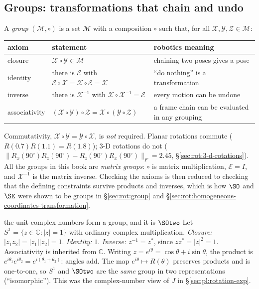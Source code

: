 \subsection{Groups: transformations that chain and undo}\label{sec:lie:group-axioms}

A \emph{group} $(\mathcal M,\circ)$ is a set $\mathcal M$ with a composition $\circ$ such that, for all $\mathcal X,\mathcal Y,\mathcal Z\in\mathcal M$:
\begin{center}\small
\begin{tabular}{@{}lll@{}}\toprule
axiom & statement & robotics meaning\\\midrule
closure & $\mathcal X\circ\mathcal Y\in\mathcal M$ & chaining two poses gives a pose\\
identity & there is $\mathcal E$ with $\mathcal E\circ\mathcal X=\mathcal X\circ\mathcal E=\mathcal X$ & ``do nothing'' is a transformation\\
inverse & there is $\mathcal X^{-1}$ with $\mathcal X\circ\mathcal X^{-1}=\mathcal E$ & every motion can be undone\\
associativity & $(\mathcal X\circ\mathcal Y)\circ\mathcal Z=\mathcal X\circ(\mathcal Y\circ\mathcal Z)$ & a frame chain can be evaluated in any grouping\\\bottomrule
\end{tabular}
\end{center}
Commutativity, $\mathcal X\circ\mathcal Y=\mathcal Y\circ\mathcal X$, is \emph{not} required. Planar rotations commute ($R(0.7)R(1.1)=R(1.8)$); 3-D rotations do not ($\|R_x(90^\circ)R_z(90^\circ)-R_z(90^\circ)R_x(90^\circ)\|_F=2.45$, \S\ref{sec:rot:3-d-rotations}). All the groups in this book are \emph{matrix groups}: $\circ$ is matrix multiplication, $\mathcal E=I$, and $\mathcal X^{-1}$ is the matrix inverse. Checking the axioms is then reduced to checking that the defining constraints survive products and inverses, which is how $\SO$ and $\SE$ were shown to be groups in \S\ref{sec:rot:group} and \S\ref{sec:rot:homogeneous-coordinates-transformation}.

\begin{deriv}{the unit complex numbers form a group, and it is $\SOtwo$}
Let $S^1=\{z\in\mathbb C:|z|=1\}$ with ordinary complex multiplication. \emph{Closure:} $|z_1z_2|=|z_1||z_2|=1$. \emph{Identity:} $1$. \emph{Inverse:} $z^{-1}=z^*$, since $zz^*=|z|^2=1$. Associativity is inherited from $\mathbb C$. Writing $z=e^{i\theta}=\cos\theta+i\sin\theta$, the product is $e^{i\theta_1}e^{i\theta_2}=e^{i(\theta_1+\theta_2)}$: angles add. The map $e^{i\theta}\mapsto R(\theta)$ preserves products and is one-to-one, so $S^1$ and $\SOtwo$ are the \emph{same} group in two representations (``isomorphic''). This was the complex-number view of $J$ in \S\ref{sec:pl:rotation-exp}.
\end{deriv}

